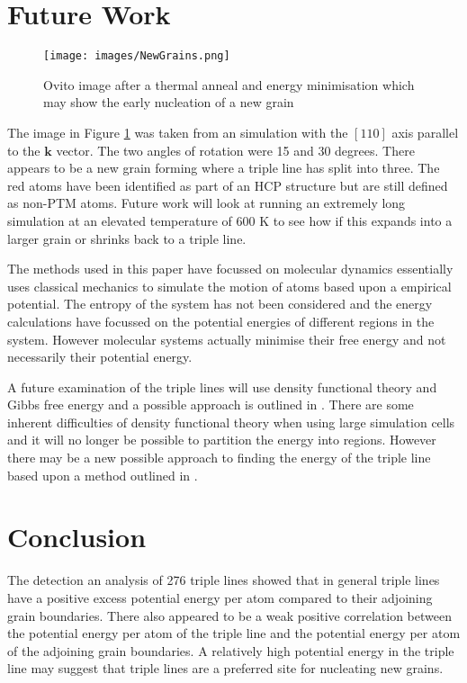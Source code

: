 \documentclass[12pt,a4paper,openany]{report}
\begin{document}
\section{Future Work} \label{sec:FutureWork}


\begin{figure}[H]
	\centering
	\texttt{[image: images/NewGrains.png]}
	\caption{Ovito image after a thermal anneal and energy minimisation which may show the early nucleation of a new grain}
	\label{fig:NewGrains}
\end{figure}

The image in Figure \ref{fig:NewGrains} was taken from an  simulation with the $[1 1 0]$ axis parallel to the $\mathbf{k}$ vector. The two angles of rotation were 15 and 30 degrees. There appears to be a new grain forming where a triple line has split into three. The red atoms have been identified as part of an HCP structure but are still defined as non-PTM atoms. Future work will look at running an extremely long simulation at an elevated temperature of $600$ K to see how if this expands into a larger grain or shrinks back to a triple line. 

The methods used in this paper have focussed on molecular dynamics essentially uses classical mechanics to simulate the motion of atoms based upon a empirical potential. The entropy of the system has not been considered and the energy calculations have focussed on the potential energies of different regions in the system. However molecular systems actually minimise their free energy and not necessarily their potential energy. 

A future examination of the triple lines will use density functional theory and Gibbs free energy and a possible approach is outlined in \cite{HASHIBON2010939}. There are some inherent difficulties of density functional theory when using large simulation cells and it will no longer be possible to partition the energy into regions. However there may be a new possible approach to finding the energy of the triple line based upon a method outlined in \cite{Lee2004}.

\section{Conclusion}

The detection an analysis of 276 triple lines showed that in general triple lines have a positive excess potential energy per atom compared to their adjoining grain boundaries. There also appeared to be a weak positive correlation between the potential energy per atom of the triple line and the potential energy per atom of the adjoining grain boundaries. A relatively high potential energy in the triple line may suggest that triple lines are a preferred site for nucleating new grains. 
\end{document}
